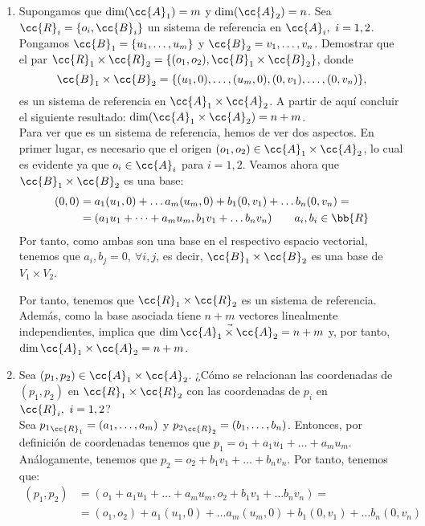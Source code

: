 \begin{ejercicio}
\begin{enumerate}
    \item Supongamos que $\dim(\cc{A}_1) = m$ y $\dim(\cc{A}_2) = n$. Sea $\cc{R}_i = \{ o_i, \cc{B}_i\}$ un sistema de referencia en $\cc{A}_i,~i = 1, 2$. Pongamos $\cc{B}_1 = \{u_1, \dots , u_m\}$ y $\cc{B}_2 = {v_1, \dots , v_n}$. Demostrar que el par $\cc{R}_1 \times \cc{R}_2 = \{(o_1, o_2), \cc{B}_1 \times \cc{B}_2\}$, donde
    \begin{equation*}
        \cc{B}_1 \times \cc{B}_2 = \{ (u_1, 0), \dots ,(u_m, 0),(0, v_1), \dots ,(0, v_n)\},
    \end{equation*}
    es un sistema de referencia en $\cc{A}_1 \times \cc{A}_2$. A partir de aquí concluir el siguiente resultado: $\dim(\cc{A}_1 \times \cc{A}_2) = n + m$.\\

    Para ver que es un sistema de referencia, hemos de ver dos aspectos. En primer lugar, es necesario que el origen $(o_1,o_2)\in \cc{A}_1\times \cc{A}_2$, lo cual es evidente ya que $o_i\in \cc{A}_i$ para $i=1,2$. Veamos ahora que $\cc{B}_1\times \cc{B}_2$ es una base:
    \begin{equation*}\begin{split}
        (0,0)&=a_1(u_1,0)+ \dots a_m(u_m,0) + b_1(0,v_1) + \dots b_n(0,v_n) =\\
        &= (a_1u_1+\dots + a_mu_m, b_1v_1 + \dots b_nv_n) \qquad a_i,b_i\in \bb{R}
    \end{split}\end{equation*}
    Por tanto, como ambas son una base en el respectivo espacio vectorial, tenemos que $a_i,b_j= 0,~\forall i,j$, es decir, $\cc{B}_1\times \cc{B}_2$ es una base de ${V}_1\times {V}_2$.
    
    Por tanto, tenemos que $\cc{R}_1\times \cc{R}_2$ es un sistema de referencia. Además, como la base asociada tiene $n+m$ vectores linealmente independientes, implica que $\dim \vec{\cc{A}_1\times \cc{A}_2}=n+m$ y, por tanto, $\dim {\cc{A}_1\times \cc{A}_2}=n+m$.
    

    \item Sea $(p_1, p_2) \in \cc{A}_1 \times \cc{A}_2$. ¿Cómo se relacionan las coordenadas de $(p_1, p_2)$ en $\cc{R}_1 \times \cc{R}_2$ con las coordenadas de $p_i$ en $\cc{R}_i,~i = 1, 2$?\\

    Sea ${p_1}_{\cc{R}_1}=(a_1,\dots,a_m)$ y ${p_2}_{\cc{R}_2}=(b_1,\dots,b_n)$. Entonces, por definición de coordenadas tenemos que $p_1=o_1+a_1u_1+\dots+a_mu_m$. Análogamente, tenemos que $p_2=o_2+b_1v_1+\dots+b_n v_n$. Por tanto, tenemos que:
    \begin{equation*}\begin{split}
        (p_1,p_2) &=(o_1+a_1u_1+\dots + a_mu_m, o_2 + b_1v_1 + \dots b_nv_n) =\\
        &= (o_1,o_2) + a_1(u_1,0)+ \dots a_m(u_m,0) + b_1(0,v_1) + \dots b_n(0,v_n)
    \end{split}\end{equation*}


\end{enumerate}
\end{ejercicio}
